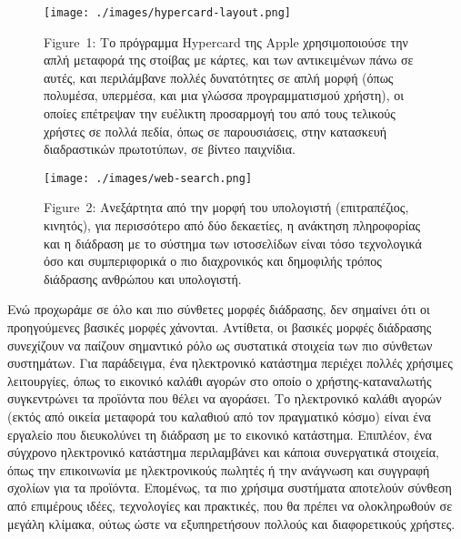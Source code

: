 \documentclass[
]{article}
\begin{document}
\leavevmode{}%
\begin{figure}
\hypertarget{fig:hypercard-layout}{%
\centering
\texttt{[image: ./images/hypercard-layout.png]}
\caption{Figure~1: Το πρόγραμμα Hypercard της Apple χρησιμοποιούσε την
απλή μεταφορά της στοίβας με κάρτες, και των αντικειμένων πάνω σε αυτές,
και περιλάμβανε πολλές δυνατότητες σε απλή μορφή (όπως πολυμέσα,
υπερμέσα, και μια γλώσσα προγραμματισμού χρήστη), οι οποίες επέτρεψαν
την ευέλικτη προσαρμογή του από τους τελικούς χρήστες σε πολλά πεδία,
όπως σε παρουσιάσεις, στην κατασκευή διαδραστικών πρωτοτύπων, σε βίντεο
παιχνίδια.}\label{fig:hypercard-layout}
}
\end{figure}

\leavevmode{}%
\begin{figure}
\hypertarget{fig:web-search}{%
\centering
\texttt{[image: ./images/web-search.png]}
\caption{Figure~2: Ανεξάρτητα από την μορφή του υπολογιστή
(επιτραπέζιος, κινητός), για περισσότερο από δύο δεκαετίες, η ανάκτηση
πληροφορίας και η διάδραση με το σύστημα των ιστοσελίδων είναι τόσο
τεχνολογικά όσο και συμπεριφορικά ο πιο διαχρονικός και δημοφιλής τρόπος
διάδρασης ανθρώπου και υπολογιστή.}\label{fig:web-search}
}
\end{figure}

Ενώ προχωράμε σε όλο και πιο σύνθετες μορφές διάδρασης, δεν σημαίνει ότι
οι προηγούμενες βασικές μορφές χάνονται. Αντίθετα, οι βασικές μορφές
διάδρασης συνεχίζουν να παίζουν σημαντικό ρόλο ως συστατικά στοιχεία των
πιο σύνθετων συστημάτων. Για παράδειγμα, ένα ηλεκτρονικό κατάστημα
περιέχει πολλές χρήσιμες λειτουργίες, όπως το εικονικό καλάθι αγορών στο
οποίο ο χρήστης-καταναλωτής συγκεντρώνει τα προϊόντα που θέλει να
αγοράσει. Το ηλεκτρονικό καλάθι αγορών (εκτός από οικεία μεταφορά του
καλαθιού από τον πραγματικό κόσμο) είναι ένα εργαλείο που διευκολύνει τη
διάδραση με το εικονικό κατάστημα. Επιπλέον, ένα σύγχρονο ηλεκτρονικό
κατάστημα περιλαμβάνει και κάποια συνεργατικά στοιχεία, όπως την
επικοινωνία με ηλεκτρονικούς πωλητές ή την ανάγνωση και συγγραφή σχολίων
για τα προϊόντα. Επομένως, τα πιο χρήσιμα συστήματα αποτελούν σύνθεση
από επιμέρους ιδέες, τεχνολογίες και πρακτικές, που θα πρέπει να
ολοκληρωθούν σε μεγάλη κλίμακα, ούτως ώστε να εξυπηρετήσουν πολλούς και
διαφορετικούς χρήστες.
\end{document}
